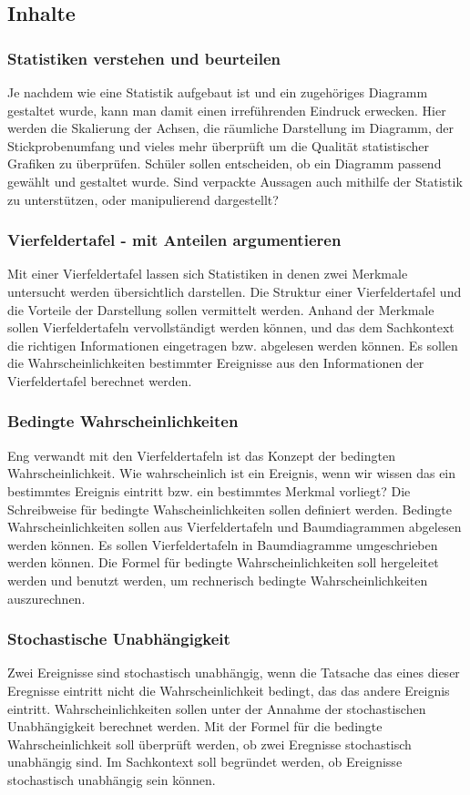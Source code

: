 \documentclass{article}
\begin{document}
\subsection{Inhalte}
\subsubsection*{Statistiken verstehen und beurteilen}
Je nachdem wie eine Statistik aufgebaut ist und ein zugehöriges Diagramm gestaltet wurde, kann man damit einen irreführenden Eindruck erwecken.
Hier werden die Skalierung der Achsen, die räumliche Darstellung im Diagramm, der Stickprobenumfang und vieles mehr überprüft um die Qualität statistischer Grafiken zu überprüfen.
Schüler sollen entscheiden, ob ein Diagramm passend gewählt und gestaltet wurde. Sind verpackte Aussagen auch mithilfe der Statistik zu unterstützen, oder manipulierend dargestellt?
\subsubsection*{Vierfeldertafel - mit Anteilen argumentieren}
Mit einer Vierfeldertafel lassen sich Statistiken in denen zwei Merkmale untersucht werden übersichtlich darstellen.
Die Struktur einer Vierfeldertafel und die Vorteile der Darstellung sollen vermittelt werden. 
Anhand der Merkmale sollen Vierfeldertafeln vervollständigt werden können, und das dem Sachkontext die richtigen Informationen eingetragen bzw. abgelesen werden können.
Es sollen die Wahrscheinlichkeiten bestimmter Ereignisse aus den Informationen der Vierfeldertafel berechnet werden.
\subsubsection*{Bedingte Wahrscheinlichkeiten}
Eng verwandt mit den Vierfeldertafeln ist das Konzept der bedingten Wahrscheinlichkeit.
Wie wahrscheinlich ist ein Ereignis, wenn wir wissen das ein bestimmtes Ereignis eintritt bzw. ein bestimmtes Merkmal vorliegt?
Die Schreibweise für bedingte Wahscheinlichkeiten sollen definiert werden.
Bedingte Wahrscheinlichkeiten sollen aus Vierfeldertafeln und Baumdiagrammen abgelesen werden können.
Es sollen Vierfeldertafeln in Baumdiagramme umgeschrieben werden können.
Die Formel für bedingte Wahrscheinlichkeiten soll hergeleitet werden und benutzt werden, um rechnerisch bedingte Wahrscheinlichkeiten auszurechnen.

\subsubsection*{Stochastische Unabhängigkeit}
Zwei Ereignisse sind stochastisch unabhängig, wenn die Tatsache das eines dieser Eregnisse eintritt nicht die Wahrscheinlichkeit bedingt, das das andere Ereignis eintritt.
Wahrscheinlichkeiten sollen unter der Annahme der stochastischen Unabhängigkeit berechnet werden.
Mit der Formel für die bedingte Wahrscheinlichkeit soll überprüft werden, ob zwei Eregnisse stochastisch unabhängig sind.
Im Sachkontext soll begründet werden, ob Ereignisse stochastisch unabhängig sein können.
\end{document}
